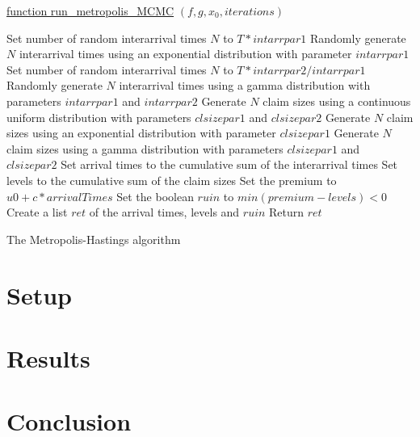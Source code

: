 \documentclass[a4paper,10pt]{article}\usepackage[]{graphicx}\usepackage[]{color}
\begin{document}
\begin{algorithm}[H]

    \underline{function run\_metropolis\_MCMC} $(f, g,x_0, iterations)$\;
    
      {
        Set number of random interarrival times $N$ to $T * intarrpar1$\;
        Randomly generate $N$ interarrival times using an exponential distribution with parameter $intarrpar1$\;
      }
      {
        Set number of random interarrival times $N$ to $T * intarrpar2 / intarrpar1$\;
        Randomly generate $N$ interarrival times using a gamma distribution with parameters $intarrpar1$ and $intarrpar2$\;
      }
     {
        Generate $N$ claim sizes using a continuous uniform distribution with parameters $clsizepar1$ and $clsizepar2$\;
     }
     {
        Generate $N$ claim sizes using an exponential distribution with parameter $clsizepar1$\;
     }
     {
        Generate $N$ claim sizes using a gamma distribution with parameters $clsizepar1$ and $clsizepar2$\;
     }
    Set arrival times to the cumulative sum of the interarrival times\;
    Set levels to the cumulative sum of the claim sizes\;
    Set the premium to $u0 + c * arrivalTimes$\;
    Set the boolean $ruin$ to $min(premium - levels) < 0$\;
    Create a list $ret$ of the arrival times, levels and $ruin$\;
    Return $ret$\;
    \caption{The Metropolis-Hastings algorithm}
\end{algorithm}

\section{Setup}\label{Set}

\section{Results}\label{Res}

\section{Conclusion}\label{Con}
\end{document}
